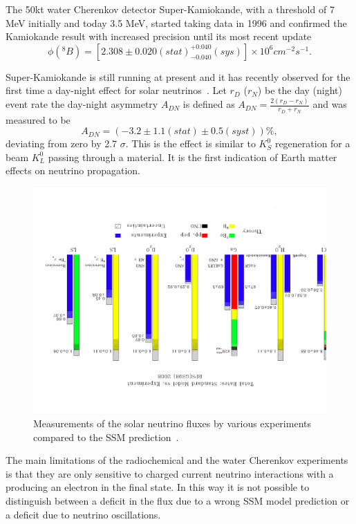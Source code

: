 The 50kt water Cherenkov detector Super-Kamiokande, with a threshold of 7 MeV initially and today 3.5 MeV, started taking data in 1996 and confirmed the Kamiokande result with increased precision until its most recent update~\cite{abesk4}
\begin{equation}
\phi( ^8 B) = [2.308 \pm 0.020 (stat) ^{+0.040}_{-0.040} (sys)] \times 10^6 cm^{-2} s^{-1}.
\end{equation} 

Super-Kamiokande is still running at present and it has recently observed for the first time a day-night effect for solar neutrinos~\cite{renshaw}. 
Let $r_D$ ($r_N$) be the day (night) event rate
the day-night asymmetry $A_{DN}$ is defined as $A_{DN} = \frac{2 (r_D - r_N) }{r_D + r_N}$ and was measured to be
\begin{equation}
A_{DN} = (-3.2 \pm 1.1 (stat) \pm 0.5 (syst)) \%,
\end{equation} 
deviating from zero by 2.7 $\sigma$.
This is the effect is similar to $K_S^0$ regeneration for a beam $K_L^0$ passing through a material. It is the first indication of Earth matter effects on neutrino propagation. 


\begin{figure}[htbp]
\centering
\includegraphics[angle=180,width=0.8\linewidth]{figures/theoryvsexpsnu1.pdf}
  \caption{
Measurements of the solar neutrino fluxes by various experiments compared to the SSM prediction~\cite{serenellif}.
}
 \label{fig:sol-theoryexp}
 \end{figure}

The main limitations of the radiochemical and the water Cherenkov experiments is that they are only sensitive to charged current neutrino interactions with a \nue producing an electron in the final state. In this way it is not possible to distinguish between a deficit in the \nue flux due to a wrong SSM model prediction or a deficit due to neutrino oscillations.

